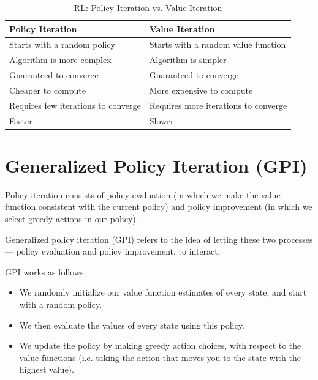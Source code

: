 \begin{table}[h]
    \centering
    \begin{tabular}{|p{6cm}|p{6cm}|}
        \hline
        \textbf{Policy Iteration} & \textbf{Value Iteration} \\
        \hline
        Starts with a random policy & Starts with a random value function \\
        \hline
        Algorithm is more complex & Algorithm is simpler \\
        \hline
        Guaranteed to converge & Guaranteed to converge \\
        \hline
        Cheaper to compute & More expensive to compute \\
        \hline
        Requires few iterations to converge & Requires more iterations to converge \\
        \hline
        Faster & Slower \\
        \hline
    \end{tabular}
    \caption{RL: Policy Iteration vs. Value Iteration}
\end{table}


\section{Generalized Policy Iteration (GPI) \cite{medium/towardsdatascience.com/introduction-to-reinforcement-learning-rl-part-4-dynamic-programming-6af57e575b3d}}\label{Generalized Policy Iteration (GPI)}

Policy iteration consists of policy evaluation (in which we make the value function consistent with the current policy) and policy improvement (in which we select greedy actions in our policy).

Generalized policy iteration (GPI) refers to the idea of letting these two processes — policy evaluation and policy improvement, to interact.

GPI works as follows:
\begin{itemize}
    \item We randomly initialize our value function estimates of every state, and start with a random policy.

    \item We then evaluate the values of every state using this policy.

    \item We update the policy by making greedy action choices, with respect to the value functions (i.e. taking the action that moves you to the state with the highest value).
\end{itemize}

